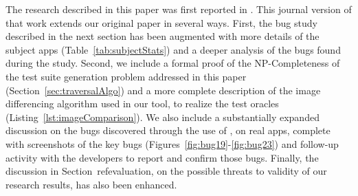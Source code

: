 The research described in this paper was first reported in \cite{quantum:ICST2013}. This journal version of that work
extends our original paper in several ways. First, the bug study described in the next section has been augmented with 
more details of the subject apps (Table~\ref{tab:subjectStats}) and a deeper analysis of the bugs found during the 
study. Second, we include a formal proof of the NP-Completeness of the test suite generation problem addressed in this
paper (Section~\ref{sec:traversalAlgo}) and a more complete description of the image differencing algorithm used in our \tool tool, to realize the
test oracles (Listing~\ref{lst:imageComparison}). We also include a substantially expanded discussion on the bugs 
discovered through the use of \tool, on real apps, complete with screenshots of the key bugs (Figures~\ref{fig:bug19}-\ref{fig:bug23})
and follow-up activity with the developers to report and confirm those bugs.
Finally, the discussion in Section~ref{evaluation}, on the possible threats to validity of our research results, has also been enhanced.
